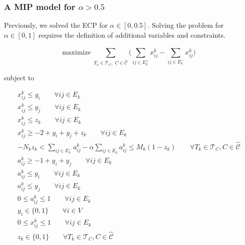 \subsubsection{A MIP model for $\alpha > 0.5$}

Previously, we solved the \acrshort{ECP} for $\alpha \in [0, 0.5]$. Solving the problem for $\alpha \in [0, 1]$ requires the definition of
additional variables and constraints.

\begin{equation}
	\label{eq:ecp-exact2}
	\text{maximize} \; \sum_{ T_{k} \in \mathcal{T}_{C}, \; C \in
		\mathcal{\hat{C}} } \big( \sum^{}_{ij \in E^{+}_k } x_{ij}
	^{k} - \sum_{ij \in E^{-} _k} x_{ij} ^{k} \big)
\end{equation} \begin{center} subject to \end{center}
\begin{gather}
	\label{eq:ecp-v12}
	x _{ij}^{k}  \leq y_i \quad\quad \forall ij \in E_k  \\
	\label{eq:ecp-v22}
	x _{ij}^{k}  \leq y_j \quad\quad \forall ij \in E_k \\
	\label{eq:ecp-t2}
	x _{ij}^{k}  \leq z_k \quad\quad \forall ij \in E_k \\
	\label{eq:ecp-e2}
	x _{ij} ^{k} \geq - 2 + y_i + y_j + z_k \quad\quad \forall ij \in E_k \\
	\label{eq:ecp-a-alpha-constraint}
	-N_k z_k < \sum^{}_{ij \in E^-_k} a_{ij}^{k}  - \alpha \sum^{}_{ij
		\in E_k}
	a_{ij} ^{k} \leq M_{k} (1 - z_{k})  \quad\quad \forall T_{k} \in
	\mathcal{T} _{C}, C \in \mathcal{\hat{C}} \\
	\label{eq:ecp-a-ij-g-i-j2}
	a_{ij}^{k} \geq -1 + y_i + y_j \quad\quad \forall ij \in E_k \\
	\label{eq:ecp-a-ij-l-i2}
	a_{ij}^{k} \leq y_i\quad\quad \forall ij \in E_k \\
	\label{eq:ecp-a-ij-l-j2}
	a_{ij}^{k} \leq y_j \quad\quad \forall ij \in E_k \\
	\label{eq:ecp-a-domain-2}
	0 \leq a_{ij}^{k} \leq 1 \quad\quad \forall ij \in E_k \\
	\label{eq:ecp-vertex-def2}
	y _{i} \in  \{0, 1\} \quad\quad \forall i \in V \\
	\label{eq:ecp-edge-def2}
	0 \leq x _{ij} ^{k}  \leq 1 \quad\quad \forall ij \in E_k \\
	\label{eq:ecp-z-domain-2}
	z _{k} \in  \{0, 1\} \quad\quad \forall T_{k} \in \mathcal{T} _{C}, C \in
	\hat{\mathcal{C}}
\end{gather}

